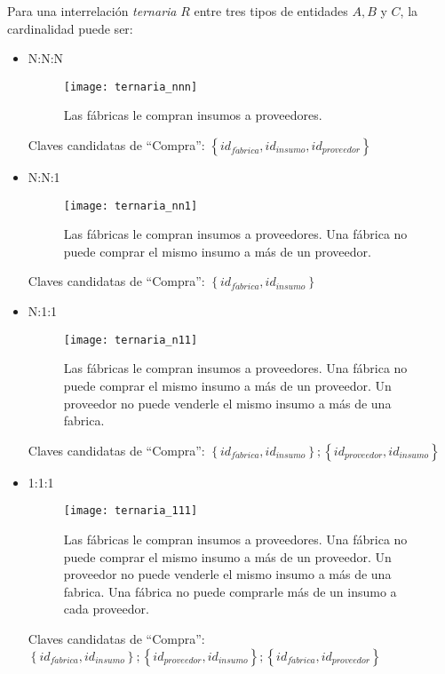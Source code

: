 \documentclass[a4paper, twoside]{article}
\begin{document}
Para una interrelación \emph{ternaria} $R$ entre tres tipos de entidades $A,B$ y $C$, la cardinalidad puede ser:	\begin{itemize}
	\item N:N:N
	\begin{figure}[H]
		\centering
		\texttt{[image: ternaria\_nnn]}
		\caption{Las fábricas le compran insumos a proveedores.}
	\end{figure}

	Claves candidatas de ``Compra'': $\left\{ id_{f\acute{a}brica},id_{insumo},id_{proveedor}\right\} $

	\item N:N:1
	\begin{figure}[H]
		\centering
		\texttt{[image: ternaria\_nn1]}
		\caption{Las fábricas le compran insumos a proveedores. Una fábrica no puede comprar el mismo insumo a más de un proveedor.}
	\end{figure}

	Claves candidatas de ``Compra'': $\left\{ id_{f\acute{a}brica},id_{insumo}\right\} $

	\item N:1:1
	\begin{figure}[H]
		\centering
		\texttt{[image: ternaria\_n11]}
		\caption{Las fábricas le compran insumos a proveedores. Una fábrica no puede comprar el mismo insumo a más de un proveedor. Un proveedor no puede venderle el mismo insumo a más de una fabrica.}
	\end{figure}

	Claves candidatas de ``Compra'': $\left\{ id_{f\acute{a}brica},id_{insumo}\right\} ;\left\{ id_{proveedor},id_{insumo}\right\} $

	\item 1:1:1
	\begin{figure}[H]
		\centering
		\texttt{[image: ternaria\_111]}
		\caption{Las fábricas le compran insumos a proveedores. Una fábrica no puede comprar el mismo insumo a más de un proveedor. Un proveedor no puede venderle el mismo insumo a más de una fabrica. Una fábrica no puede comprarle más de un insumo a cada proveedor.}
	\end{figure}

	Claves candidatas de ``Compra'': $\left\{ id_{f\acute{a}brica},id_{insumo}\right\} ;\left\{ id_{proveedor},id_{insumo}\right\} ;\left\{ id_{f\acute{a}brica},id_{proveedor}\right\} $
\end{itemize}
\end{document}
